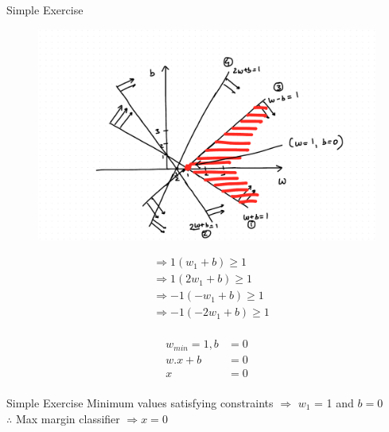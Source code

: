 \documentclass{beamer}
\begin{document}
\begin{frame}{Simple Exercise}
\begin{multicols}{2}
\begin{figure}
\includegraphics[scale=0.3]{SVM/Svm-27.pdf}
\end{figure}


\begin{align*}
&\Rightarrow 1(w_{1} + b) \geq 1\\
&\Rightarrow 1(2w_{1} + b)\geq 1\\
&\Rightarrow -1(-w_{1}+b) \geq 1\\
&\Rightarrow -1(-2w_{1}+b) \geq 1\\
\end{align*}

\end{multicols}

\begin{align*}
w_{min} = 1, b&= 0\\
w.x + b &= 0\\
x &=0 \\
\end{align*}

\end{frame}

\begin{frame}{Simple Exercise}
Minimum values satisfying constraints  $\Rightarrow$
$w_{1}$ = 1 and $b = 0$\\
$\therefore$ Max margin classifier $ \Rightarrow x = 0$

\end{frame}
\end{document}
